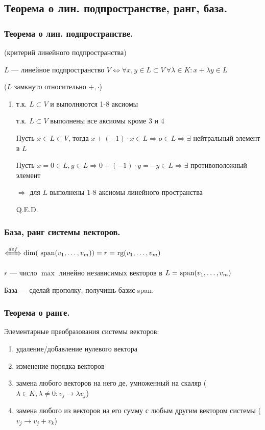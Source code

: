 \subsection{Теорема о лин. подпространстве, ранг, база.}
\subsubsection{Теорема о лин. подпространстве.}
 (критерий линейного подпространства)

\(L\) --- линейное подпространство \(V \Leftrightarrow \forall x, y \in L \subset V \ \forall \lambda \in K: x + \lambda y \in L\)

(\(L\) замкнуто относительно \(+, \cdot\))


\begin{enumerate}
    \item \prooff{}
    \fbox{\(\Rightarrow\)}
т.к. \(L \subset V\) и выполняются 1-8 аксиомы

\fbox{\(\Leftarrow\)}
т.к. \(L \subset V\) выполнены все аксиомы кроме 3 и 4

Пусть \(x \in L \subset V\), тогда \(x + (-1) \cdot x \in L \Rightarrow o \in L \Rightarrow \exists\) нейтральный элемент в \(L\)

Пусть \(x = 0 \in L, y \in L \Rightarrow 0 + (-1) \cdot y = -y \in L \Rightarrow \exists\) противоположный элемент

\(\Rightarrow\) для \(L\) выполнены 1-8 аксиомы линейного пространства

\hfill Q.E.D.
\end{enumerate}

\subsubsection{База, ранг системы векторов.}
 \(\defLeftrightarrow \dim (\spann (v_1, \ldots, v_m)) = r = \rg (v_1, \ldots, v_m)\)

\(r\) --- число \(\max\) линейно независимых векторов в \(L = \spann (v_1, \ldots, v_m)\)

База --- сделай прополку, получишь базис span.  


\subsubsection{Теорема о ранге.}

Элементарные преобразования системы векторов:

\begin{enumerate}
    \item удаление/добавление нулевого вектора

    \item изменение порядка векторов

    \item замена любого векторов на него де, умноженный на скаляр (\(\lambda \in K, \lambda \neq 0: v_j \rightarrow \lambda v_j\))

    \item замена любого из векторов на его сумму с любым другим вектором системы (\(v_j \rightarrow v_j + v_k\))
\end{enumerate}

